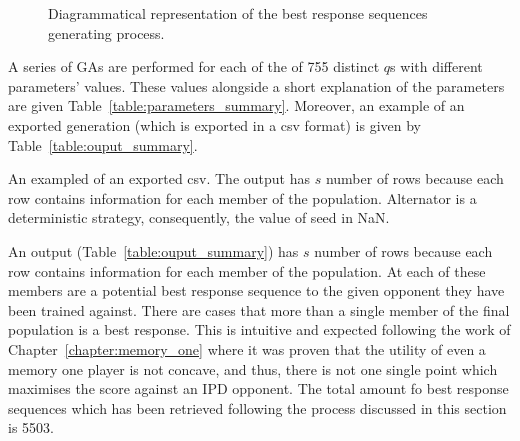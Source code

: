 \begin{figure}[!htbp]
    \centering
    
    \caption{Diagrammatical representation of the best response
    sequences generating process.}\label{fig:data_generating_process_diagram}
\end{figure}

A series of GAs are performed for each of the of 755 distinct \(q\)s with
different parameters' values. These values alongside a short explanation of the
parameters are given Table~\ref{table:parameters_summary}. Moreover,
an example of an exported generation (which is exported in a csv format)
is given by Table~\ref{table:ouput_summary}.

\begin{table}[!htbp]
    \begin{center}
    \end{center}
    \caption{The parameters of the genetic algorithm.}\label{table:parameters_summary}
\end{table}

\begin{table}[!htbp]
    \resizebox{\textwidth}{!}{
    }
    \caption{An exampled of an exported csv. The output has \(s\) number of rows because
    each row contains information for each member of the population. Alternator is
    a deterministic strategy, consequently,
    the value of seed in NaN.}\label{table:ouput_summary}
\end{table}

An output (Table~\ref{table:ouput_summary}) has \(s\) number of rows because
each row contains information for each member of the population. At each of these
members are a potential best response sequence to the given opponent they have
been trained against. There are cases that more than a single member of the
final population is a best response. This is intuitive and expected following the
work of Chapter~\ref{chapter:memory_one} where it was proven that the utility
of even a memory one player is not concave, and thus, there is not one single
point which maximises the score against an IPD opponent. The total amount
fo best response sequences which has been retrieved following the process
discussed in this section is 5503.


